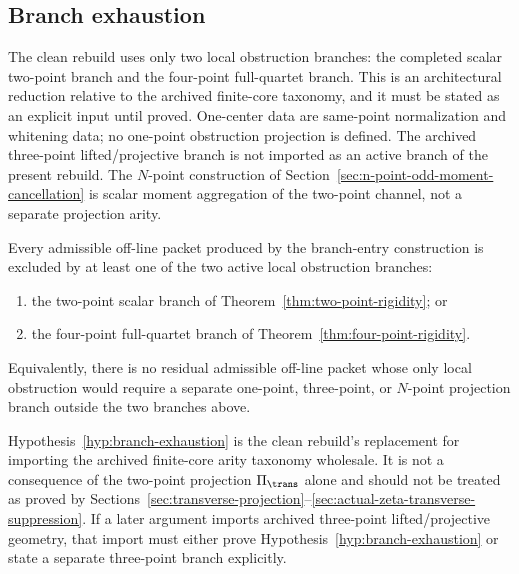 
\subsection{Branch exhaustion}
\label{subsec:branch-exhaustion}

The clean rebuild uses only two local obstruction branches: the completed
scalar two-point branch and the four-point full-quartet branch.  This is
an architectural reduction relative to the archived finite-core taxonomy,
and it must be stated as an explicit input until proved.  One-center data
are same-point normalization and whitening data; no one-point obstruction
projection is defined.  The archived three-point lifted/projective branch
is not imported as an active branch of the present rebuild.  The
\(N\)-point construction of Section~\ref{sec:n-point-odd-moment-cancellation}
is scalar moment aggregation of the two-point channel, not a separate
projection arity.

\begin{hypothesis}
\label{hyp:branch-exhaustion}
Every admissible off-line packet produced by the branch-entry construction
is excluded by at least one of the two active local obstruction branches:
\begin{enumerate}[label=\textup{(\roman*)},leftmargin=*]
\item the two-point scalar branch of
      Theorem~\ref{thm:two-point-rigidity}; or
\item the four-point full-quartet branch of
      Theorem~\ref{thm:four-point-rigidity}.
\end{enumerate}
Equivalently, there is no residual admissible off-line packet whose only
local obstruction would require a separate one-point, three-point, or
\(N\)-point projection branch outside the two branches above.
\end{hypothesis}

\begin{remark}
\label{rem:branch-exhaustion-status}
Hypothesis~\ref{hyp:branch-exhaustion} is the clean rebuild's replacement
for importing the archived finite-core arity taxonomy wholesale.  It is
not a consequence of the two-point projection
\(\Pi_\trans\) alone and should not be treated as proved by
Sections~\ref{sec:transverse-projection}--\ref{sec:actual-zeta-transverse-suppression}.
If a later argument imports archived three-point lifted/projective
geometry, that import must either prove Hypothesis~\ref{hyp:branch-exhaustion}
or state a separate three-point branch explicitly.
\end{remark}
